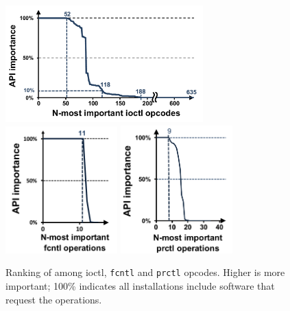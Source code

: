 \begin{figure}[t]
\centering
\includegraphics[width=3in]{syspop/figures/ioctl-popularity-by-inst.pdf}
\includegraphics[width=1.7in]{syspop/figures/fcntl-popularity-by-inst.pdf}
\includegraphics[width=1.7in]{syspop/figures/prctl-popularity-by-inst.pdf}
\caption[\Usagemetric{} of {\tt ioctl}, {\tt fcntl} and {\tt prctl} opcodes]
{Ranking of \usagemetric{} among {ioctl}, {\tt fcntl} and {\tt prctl} opcodes.  Higher is more important; 100\% indicates all installations include software that request the operations.}
\label{fig:syspop:opcode-popularity}
\end{figure}




